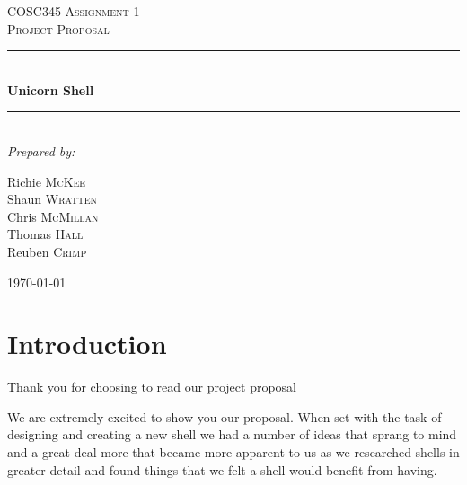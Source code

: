 \documentclass[a4paper,12pt]{article}
\begin{document}



\begin{titlepage}

  \newcommand{\HRule}{\rule{\linewidth}{0.5mm}}
  \center
  \textsc{\LARGE COSC345 Assignment 1}\\[0.5cm] 
  \textsc{\Large Project Proposal}\\[0.5cm] 

  \HRule \\[0.6cm]
         { \huge \bfseries Unicorn Shell}\\[0.4cm]
         \HRule \\[1.5cm]
         
         \Large \emph{Prepared by:}\\
         \begin{multicols}{3}
           Richie \textsc{McKee}\\
           Shaun \textsc{Wratten}\\
           \columnbreak
           Chris \textsc{McMillan}\\
           Thomas \textsc{Hall}\\
           \columnbreak
           Reuben \textsc{Crimp}\\[3cm]
         \end{multicols}
         
         \null\vfill{\large \today}\\[3cm]
\end{titlepage}

\section*{Introduction}
Thank you for choosing to read our project proposal

We are extremely excited to show you our proposal. When set with the task of designing and creating a new shell we had a number of ideas that sprang to mind and a great deal more that became more apparent to us as we researched shells in greater detail and found things that we felt a shell would benefit from having.
\end{document}
